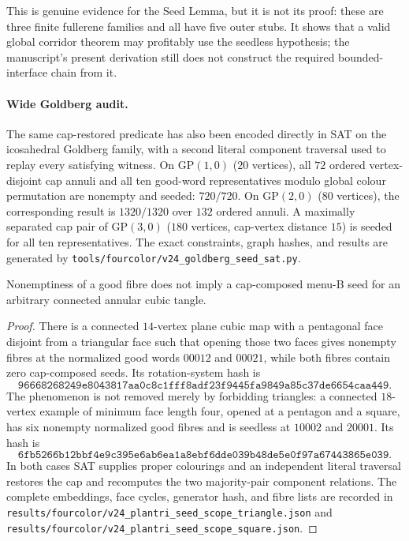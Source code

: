This is genuine evidence for the Seed Lemma, but it is not its proof: these
are three finite fullerene families and all have five outer stubs.  It shows
that a valid global corridor theorem may profitably use the seedless
hypothesis; the manuscript's present derivation still does not construct the
required bounded-interface chain from it.

\paragraph{Wide Goldberg audit.}
The same cap-restored predicate has also been encoded directly in SAT on the
icosahedral Goldberg family, with a second literal component traversal used
to replay every satisfying witness.  On $\mathrm{GP}(1,0)$ ($20$ vertices),
all $72$ ordered vertex-disjoint cap annuli and all ten good-word
representatives modulo global colour permutation are nonempty and seeded:
$720/720$.  On $\mathrm{GP}(2,0)$ ($80$ vertices), the corresponding result is
$1320/1320$ over $132$ ordered annuli.  A maximally separated cap pair of
$\mathrm{GP}(3,0)$ ($180$ vertices, cap-vertex distance $15$) is seeded for
all ten representatives.  The exact constraints, graph hashes, and results
are generated by
\texttt{tools/fourcolor/v24\_goldberg\_seed\_sat.py}.

\begin{proposition}
\label{prop:unrestricted-seed-refuted}
Nonemptiness of a good fibre does not imply a cap-composed menu-B seed for
an arbitrary connected annular cubic tangle.
\end{proposition}

\begin{proof}
There is a connected $14$-vertex plane cubic map with a pentagonal face
disjoint from a triangular face such that opening those two faces gives
nonempty fibres at the normalized good words \(00012\) and \(00021\), while
both fibres contain zero cap-composed seeds.  Its rotation-system hash is
\[
  \texttt{96668268249e8043817aa0c8c1fff8adf23f9445fa9849a85c37de6654caa449}.
\]
The phenomenon is not removed merely by forbidding triangles: a connected
$18$-vertex example of minimum face length four, opened at a pentagon and
a square, has six nonempty normalized good fibres and is seedless at
\(10002\) and \(20001\).  Its hash is
\[
  \texttt{6fb5266b12bbf4e9c395e6ab6ea1a8ebf6dde039b48de5e0f97a67443865e039}.
\]
In both cases SAT supplies proper colourings and an independent literal
traversal restores the cap and recomputes the two majority-pair component
relations.  The complete embeddings, face cycles, generator hash, and
fibre lists are recorded in
\texttt{results/fourcolor/v24\_plantri\_seed\_scope\_triangle.json} and
\texttt{results/fourcolor/v24\_plantri\_seed\_scope\_square.json}.
\end{proof}

